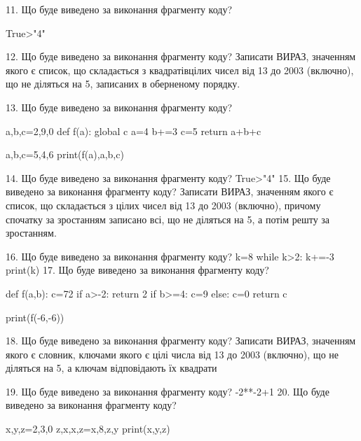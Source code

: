 \documentclass[11pt]{article}
\begin{document}

11. Що буде виведено за виконання фрагменту коду?

True>"4"

12. Що буде виведено за виконання фрагменту коду?
Записати ВИРАЗ, значенням якого є список, що складається з квадратівцілих чисел від 13 до 2003 (включно), що не діляться на 5, записаних в обернено\-му порядку.

13. Що буде виведено за виконання фрагменту коду?

a,b,c=2,9,0
def f(a):
global c    a=4
    b+=3
    c=5
    return a+b+c

a,b,c=5,4,6
print(f(a),a,b,c)

14. Що буде виведено за виконання фрагменту коду?
True>"4"
15. Що буде виведено за виконання фрагменту коду?
Записати ВИРАЗ, значенням якого є список, що складається з цілих чисел від 13 до 2003 (включно), причому спочатку за зростанням записано всі, що не діляться на 5, а потім решту за зростанням.

16. Що буде виведено за виконання фрагменту коду?
k=8
   while k>2: k+=-3
   print(k)
17. Що буде виведено за виконання фрагменту коду?

def f(a,b):
    c=72
    if a>-2:
        return 2
    if b>=4:
         c=9
    else: 
        c=0
    return c

print(f(-6,-6))

18. Що буде виведено за виконання фрагменту коду?
Записати ВИРАЗ, значенням якого є словник, ключами якого є цілі числа від 13 до 2003 (включно), що не діляться на 5, а ключам відповідають їх квадрати 

19. Що буде виведено за виконання фрагменту коду?
-2**-2+1
20. Що буде виведено за виконання фрагменту коду?

x,y,z=2,3,0
z,x,x,z=x,8,z,y
print(x,y,z)





















\newpage
\end{document}
